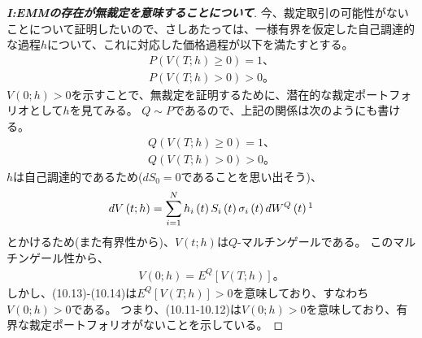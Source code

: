 \documentclass{jsbook}
\theoremstyle{withoutdotendstyle}
\numberwithin{theorem}{chapter}%
\begin{document}
\begin{proof}[{\bf I:EMMの存在が無裁定を意味することについて}]
  今、裁定取引の可能性がないことについて証明したいので、さしあたっては、一様有界を仮定した自己調達的な過程$h$について、これに対応した価格過程が以下を満たすとする。
  \begin{align}
    P\left(V\left(T;h\right)\geq 0\right) = 1\mbox{、}\\
    P\left(V\left(T;h\right)> 0\right) > 0\mbox{。}
  \end{align}
  $V\left(0;h\right)> 0$を示すことで、無裁定を証明するために、潜在的な裁定ポートフォリオとして$h$を見てみる。
  $Q\sim P$であるので、上記の関係は次のようにも書ける。
  \begin{align}
    Q\left(V\left(T;h\right)\geq 0\right) = 1\mbox{、}\\
    Q\left(V\left(T;h\right)> 0\right) > 0\mbox{。}
  \end{align}
  $h$は自己調達的であるため($dS_{0}=0$であることを思い出そう)、
  \begin{align}
    dV\left(t;h\right)=\sum_{i=1}^{N}h_{i}\left(t\right)S_{i}\left(t\right)\sigma_{i}\left(t\right)dW^{Q}\left(t\right)\footnotemark
  \end{align}
  とかけるため(また有界性から)、$V\left(t;h\right)$は$Q$-マルチンゲールである。
  このマルチンゲール性から、
  \begin{align}
    V\left(0;h\right)=E^{Q}\left[V\left(T;h\right)\right]\mbox{。}
  \end{align}
  しかし、(10.13)-(10.14)は$E^{Q}\left[V\left(T;h\right)\right]>0$を意味しており\footnotemark、すなわち$V\left(0;h\right)>0$である。
  つまり、(10.11-10.12)は$V\left(0;h\right)>0$を意味しており、有界な裁定ポートフォリオがないことを示している。


\end{proof}
\end{document}
